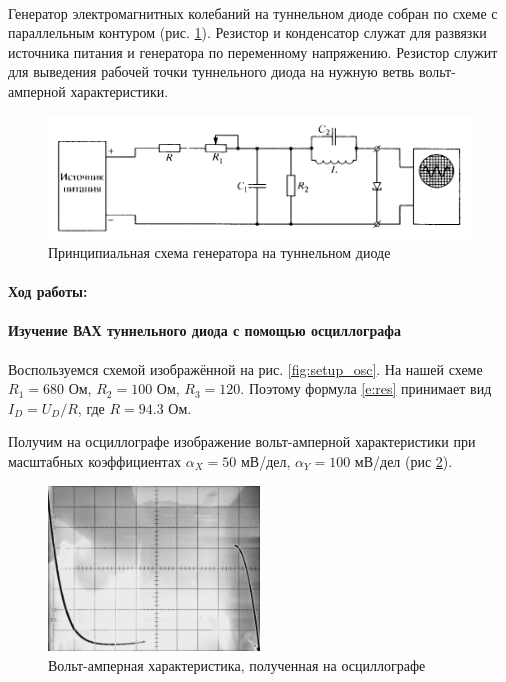 \documentclass[a4paper,12pt]{article}
\begin{document}
\paragraph{}
	Генератор электромагнитных колебаний на туннельном диоде собран по схеме с параллельным контуром (рис. \ref{fig:setup_gen}). Резистор и конденсатор служат для развязки источника питания и генератора по переменному напряжению. Резистор служит для выведения рабочей точки туннельного диода на нужную ветвь вольт-амперной характеристики.


\begin{figure}[h]
\centering
\includegraphics[width=\textwidth]{setup_gen.png}
\caption{Принципиальная схема генератора на туннельном диоде}
\label{fig:setup_gen}
\end{figure}
\paragraph{Ход работы:}
\paragraph{Изучение ВАХ туннельного диода с помощью осциллографа}
	Воспользуемся схемой изображённой на рис. \ref{fig:setup_osc}. На нашей схеме $R_1 = 680$ Ом, $R_2 = 100$ Ом, $R_3 = 120$. Поэтому формула \eqref{e:res} принимает вид $I_D = U_D / R$, где $R = 94.3$ Ом.
	
	Получим на осциллографе изображение вольт-амперной характеристики при масштабных коэффициентах $\alpha_X = 50$ мВ/дел, $\alpha_Y = 100$ мВ/дел (рис \ref{fig:osc}).
	
	\begin{figure}[h]
	\centering
	\includegraphics[width=0.5\textwidth]{vac_osc.png}
	\caption{Вольт-амперная характеристика, полученная на осциллографе}
	\label{fig:osc}
	\end{figure}
	
\end{document}
